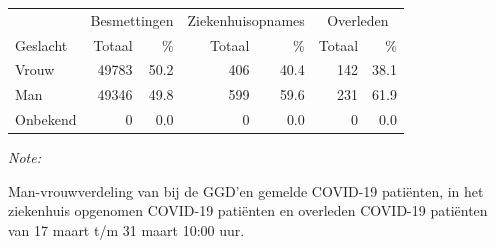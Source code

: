 \documentclass[
  english,
  man,floatsintext]{apa6}
\begin{document}
\begin{table}
\centering\begingroup\fontsize{11}{13}\selectfont

\begin{threeparttable}
\begin{tabular}{lrrrrrr}
\toprule
\multicolumn{1}{c}{ } & \multicolumn{2}{c}{Besmettingen} & \multicolumn{2}{c}{Ziekenhuisopnames} & \multicolumn{2}{c}{Overleden} \\
\cmidrule(l{3pt}r{3pt}){2-3} \cmidrule(l{3pt}r{3pt}){4-5} \cmidrule(l{3pt}r{3pt}){6-7}
Geslacht & Totaal & \% & Totaal & \% & Totaal & \%\\
\midrule
Vrouw & 49783 & 50.2 & 406 & 40.4 & 142 & 38.1\\
Man & 49346 & 49.8 & 599 & 59.6 & 231 & 61.9\\
Onbekend & 0 & 0.0 & 0 & 0.0 & 0 & 0.0\\
\bottomrule
\end{tabular}
\begin{tablenotes}
\item \textit{Note: } 
\item Man-vrouwverdeling van bij de GGD’en gemelde COVID-19 patiënten, in het ziekenhuis opgenomen COVID-19 patiënten en overleden COVID-19 patiënten van 17 maart t/m 31 maart 10:00 uur.
\end{tablenotes}
\end{threeparttable}
\endgroup{}
\end{table}
\newpage
\end{document}
